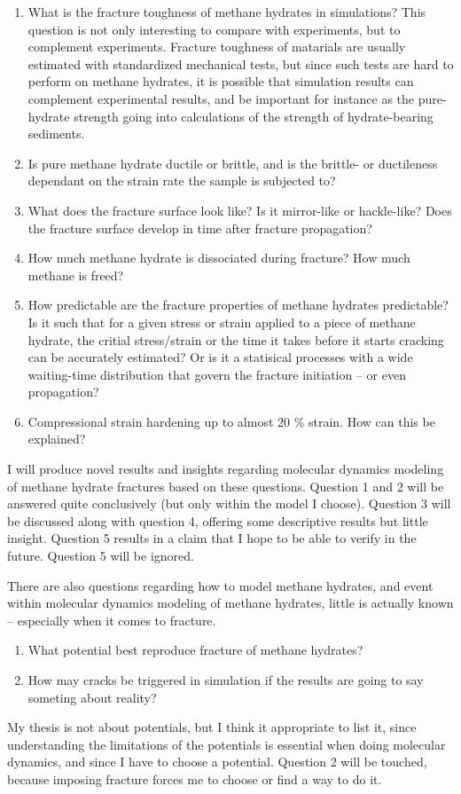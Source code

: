 \begin{enumerate}
\item What is the fracture toughness of methane hydrates in simulations? This question is not only interesting to compare with experiments, but to complement experiments. Fracture toughness of matarials are usually estimated with standardized mechanical tests, but since such tests are hard to perform on methane hydrates, it is possible that simulation results can complement experimental results, and be important for instance as the pure-hydrate strength going into calculations of the strength of hydrate-bearing sediments. 
\item Is pure methane hydrate ductile or brittle, and is the brittle- or ductileness dependant on the strain rate the sample is subjected to?
\item What does the fracture surface look like? Is it mirror-like or hackle-like? Does the fracture surface develop in time after fracture propagation?
\item How much methane hydrate is dissociated during fracture? How much methane is freed?
\item How predictable are the fracture properties of methane hydrates predictable? Is it such that for a given stress or strain applied to a piece of methane hydrate, the critial stress/strain or the time it takes before it starts cracking can be accurately estimated? Or is it a statisical processes with a wide waiting-time distribution that govern the fracture initiation -- or even propagation?
\item Compressional strain hardening up to almost 20 \% strain. How can this be explained?
\end{enumerate}

I will produce novel results and insights regarding molecular dynamics modeling of methane hydrate fractures based on these questions. Question 1 and 2 will be answered quite conclusively (but only within the model I choose). Question 3 will be discussed along with question 4, offering some descriptive results but little insight. Question 5 results in a claim that I hope to be able to verify in the future. Question 5 will be ignored.

There are also questions regarding how to model methane hydrates, and event within molecular dynamics modeling of methane hydrates, little is actually known -- especially when it comes to fracture. 

\begin{enumerate}
\item What potential best reproduce fracture of methane hydrates?
\item How may cracks be triggered in simulation if the results are going to say someting about reality?
\end{enumerate}

My thesis is not about potentials, but I think it appropriate to list it, since understanding the limitations of the potentials is essential when doing molecular dynamics, and since I have to choose a potential. Question 2 will be touched, because imposing fracture forces me to choose or find a way to do it. 
